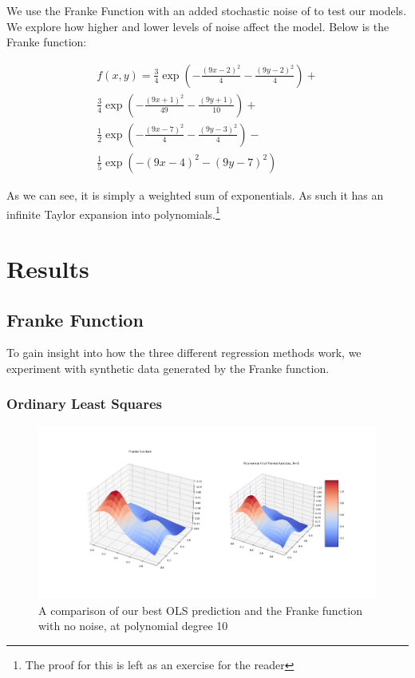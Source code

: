 \documentclass[twocolumn,10pt,cleanfoot]{asme2ej}
\begin{document}
We use the Franke Function with an added stochastic noise of to test our models. We explore how higher and lower levels of noise affect the model. Below is the Franke function:

\begin{multline}
f(x,y) = \frac{3}{4}\exp{\left(-\frac{(9x-2)^2}{4}-\frac{(9y-2)^2}{4}\right)} + \\ \frac{3}{4}\exp{\left(-\frac{(9x+1)^2}{49}-\frac{(9y+1)}{10}\right)} + \\
\frac{1}{2}\exp{\left(-\frac{(9x-7)^2}{4}-\frac{(9y-3)^2}{4}\right)} - \\
\frac{1}{5}\exp{\left(-(9x-4)^2-(9y-7)^2\right)}
\end{multline}

As we can see, it is simply a weighted sum of exponentials. As such it has an infinite Taylor expansion into polynomials.\footnote{The proof for this is left as an exercise for the reader}


\section{Results}

\subsection{Franke Function}

To gain insight into how the three different regression methods work, we experiment with synthetic data generated by the Franke function.

\subsubsection{Ordinary Least Squares}

\begin{figure} 
\centerline{\includegraphics[width=6.85in]{figure/frankenonoise.png}}
\caption{A comparison of our best OLS prediction and the Franke function with no noise, at polynomial degree 10}
\label{frankenonoise}
\end{figure}
\end{document}

